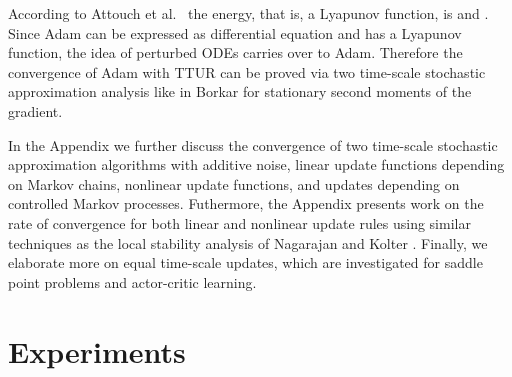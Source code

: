 \documentclass{article}
\begin{document}
According to Attouch et al.\ \cite{Attouch:00} the energy, that is,
a Lyapunov function, is 
and .
Since Adam can be expressed as differential equation and has a
Lyapunov function, the idea of
 perturbed ODEs \cite{Borkar:97,Hirsch:89,Borkar:00}
carries over to Adam.
Therefore the convergence of Adam with TTUR can be proved via two time-scale stochastic
approximation analysis like in Borkar \cite{Borkar:97}
for stationary second moments of the gradient.

In the Appendix we further discuss the convergence of two time-scale
stochastic approximation algorithms with additive noise, linear update
functions depending on Markov chains, nonlinear update functions,
and updates depending on controlled Markov processes. Futhermore, the Appendix
presents work on the rate of convergence for both linear and nonlinear update
rules using similar techniques as the local stability analysis of Nagarajan
and Kolter \cite{Nagarajan:17}.
Finally, we elaborate more on equal time-scale updates, which
are investigated for saddle point problems and actor-critic learning.

\section*{Experiments}
\label{sec:experiments}
\end{document}
